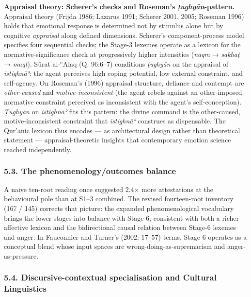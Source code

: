 \documentclass[11pt,a4paper]{article}
\begin{document}
\textbf{Appraisal theory: Scherer's checks and Roseman's
\emph{ṭughyān}-pattern.} Appraisal theory (Frijda 1986; Lazarus 1991;
Scherer 2001, 2005; Roseman 1996) holds that emotional response is
determined not by stimulus alone but by cognitive \emph{appraisal} along
defined dimensions. Scherer's component-process model specifies four
sequential checks; the Stage-3 lexemes operate as a lexicon for the
normative-significance check at progressively higher intensities
(\emph{naqm} → \emph{sakhaṭ} → \emph{maqt}). Sūrat al-ʿAlaq (Q. 96:6--7)
conditions \emph{ṭughyān} on the appraisal of \emph{istighnāʾ}: the
agent perceives high coping potential, low external constraint, and
self-agency. On Roseman's (1996) appraisal structure, defiance and
contempt are \emph{other-caused} and \emph{motive-inconsistent} (the
agent rebels against an other-imposed normative constraint perceived as
inconsistent with the agent's self-conception). \emph{Ṭughyān} on
\emph{istighnāʾ} fits this pattern: the divine command is the
other-caused, motive-inconsistent constraint that \emph{istighnāʾ}
construes as dispensable. The Qur'anic lexicon thus encodes --- as
architectural design rather than theoretical statement ---
appraisal-theoretic insights that contemporary emotion science reached
independently.

\subsubsection{5.3. The phenomenology/outcomes
balance}\label{the-phenomenologyoutcomes-balance}

A naive ten-root reading once suggested 2.4× more attestations at the
behavioural pole than at S1--3 combined. The revised fourteen-root
inventory (167 / 145) corrects that picture: the expanded
phenomenological vocabulary brings the lower stages into balance with
Stage 6, consistent with both a richer affective lexicon and the
bidirectional causal relation between Stage-6 lexemes and anger. In
Fauconnier and Turner's (2002: 17--57) terms, Stage 6 operates as a
conceptual blend whose input spaces are wrong-doing-as-supremacism and
anger-as-pressure.

\subsubsection{5.4. Discursive-contextual specialisation and Cultural
Linguistics}\label{discursive-contextual-specialisation-and-cultural-linguistics}
\end{document}
